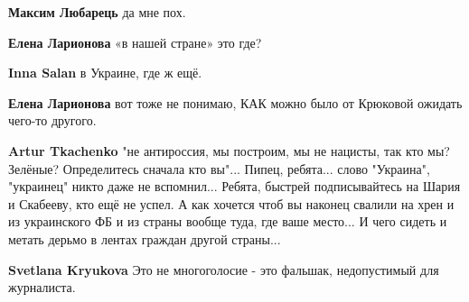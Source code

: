\begin{itemize}
\begin{itemize}
\textbf{Максим Любарець} да мне пох.

 
\textbf{Елена Ларионова} «в нашей стране» это где?

 
\textbf{Inna Salan} в Украине, где ж ещё.

 
\textbf{Елена Ларионова} вот тоже не понимаю, КАК можно было от Крюковой ожидать чего-то другого.

 
\textbf{Artur Tkachenko} "не антироссия, мы построим, мы не нацисты, так кто мы? Зелёные? Определитесь сначала кто вы"... Пипец, ребята... слово "Украина", "украинец" никто даже не вспомнил... Ребята, быстрей подписывайтесь на Шария и Скабееву, кто ещё не успел. А как хочется чтоб вы наконец свалили на хрен и из украинского ФБ и из страны вообще туда, где ваше место... И чего сидеть и метать дерьмо в лентах граждан другой страны...

 
\textbf{Svetlana Kryukova} Это не многоголосие - это фальшак, недопустимый для журналиста.

 

\end{itemize}
\end{itemize}
